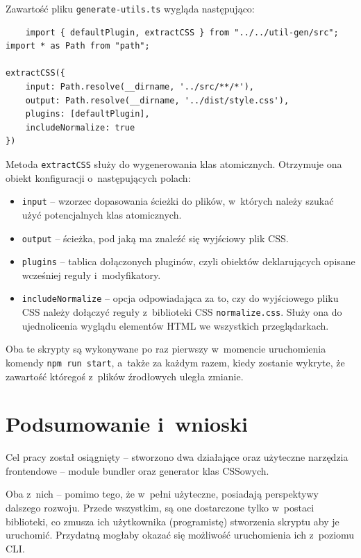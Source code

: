 \documentclass{SGGW-thesis}
\begin{document}
Zawartość pliku \verb|generate-utils.ts| wygląda następująco:
\begin{verbatim}
    import { defaultPlugin, extractCSS } from "../../util-gen/src";
import * as Path from "path";

extractCSS({
	input: Path.resolve(__dirname, '../src/**/*'),
	output: Path.resolve(__dirname, '../dist/style.css'),
	plugins: [defaultPlugin],
	includeNormalize: true
})
\end{verbatim}

Metoda \verb|extractCSS| służy do wygenerowania klas atomicznych. Otrzymuje ona obiekt konfiguracji o~następujących polach:
\begin{itemize}
    \item \verb|input| -- wzorzec dopasowania ścieżki do plików, w~których należy szukać użyć potencjalnych klas atomicznych.
    \item \verb|output| -- ścieżka, pod jaką ma znaleźć się wyjściowy plik CSS.
    \item \verb|plugins| -- tablica dołączonych pluginów, czyli obiektów deklarujących opisane wcześniej reguły i~modyfikatory.
    \item \verb|includeNormalize| -- opcja odpowiadająca za to, czy do wyjściowego pliku CSS należy dołączyć reguły z~biblioteki CSS \verb|normalize.css|. Służy ona do ujednolicenia wyglądu elementów HTML we wszystkich przeglądarkach.
\end{itemize}

Oba te skrypty są wykonywane po raz pierwszy w~momencie uruchomienia komendy \verb|npm run start|, a~także za każdym razem, kiedy zostanie wykryte, że zawartość któregoś z~plików źrodłowych uległa zmianie.

\chapter{Podsumowanie i~wnioski}
Cel pracy został osiągnięty -- stworzono dwa działające oraz użyteczne narzędzia frontendowe -- module bundler oraz generator klas CSSowych.

Oba z~nich -- pomimo tego, że w~pełni użyteczne, posiadają perspektywy dalszego rozwoju.
Przede wszystkim, są one dostarczone tylko w~postaci biblioteki, co zmusza ich użytkownika (programistę) stworzenia skryptu aby je uruchomić. Przydatną mogłaby okazać się możliwość uruchomienia ich z~poziomu CLI.
\end{document}
